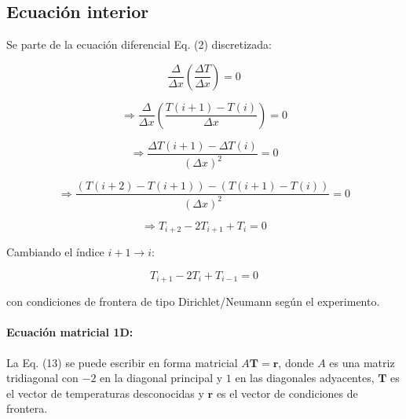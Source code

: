 \documentclass[11pt,a4paper]{article}
\begin{document}
\subsection{Ecuaci\'on interior}

Se parte de la ecuaci\'on diferencial Eq. (2) discretizada:

\begin{equation}
\frac{\Delta}{\Delta x} \left( \frac{\Delta T}{\Delta x} \right) = 0
\end{equation}

\begin{equation}
\Rightarrow \frac{\Delta}{\Delta x} \left( \frac{T(i + 1) - T(i)}{\Delta x} \right) = 0
\end{equation}

\begin{equation}
\Rightarrow\frac{ \Delta T(i + 1) - \Delta T(i)}{ (\Delta x)^2} = 0
\end{equation}

\begin{equation}
\Rightarrow \frac{\left( T(i + 2) - T(i + 1) \right) - 
\left( T(i + 1) - T(i) \right)}{ (\Delta x)^2} = 0
\end{equation}

\begin{equation}
\Rightarrow T_{i+2} - 2 T_{i+1} + T_{i} = 0
\end{equation}

Cambiando el \'indice $i+1 \to i$:

\begin{equation}
T_{i+1} -2T_i + T_{i-1}=0
\end{equation}

con condiciones de frontera de tipo Dirichlet/Neumann seg\'un el experimento.

\medskip

\paragraph{Ecuaci\'on matricial 1D:}

La Eq. (13) se puede escribir en forma matricial $A \mathbf{T} = \mathbf{r}$,
donde $A$ es una matriz tridiagonal con $-2$ en la diagonal principal y $1$ 
en las diagonales adyacentes, $\mathbf{T}$ es el vector de temperaturas 
desconocidas y $\mathbf{r}$ es el vector de condiciones de frontera.
\end{document}
